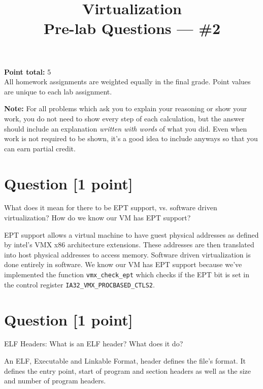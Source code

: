 \documentclass[11pt]{article}
\providecommand{\due}{}
\begin{document}
\title{Virtualization\\Pre-lab Questions --- \#2}
\date{\due}

\maketitle

\noindent \textbf{Point total:} 5
\\ All homework assignments are weighted equally in the final grade. Point values are unique to each lab assignment.

\textbf{Note:} For all problems which ask you to explain your reasoning or show your work, you do not need to show every step of each calculation, but the answer should include an explanation \emph{written with words} of what you did.  Even when work is not required to be shown, it’s a good idea to include anyways so that you can earn partial credit.

\section{Question [1 point]}

What does it mean for there to be EPT support, vs. software driven virtualization? How do we know our VM has EPT support?

\begin{solution}
EPT support allows a virtual machine to have guest physical addresses as defined by intel's VMX x86 architecture extensions. These addresses are then translated into host physical addresses to access memory. Software driven virtualization is done entirely in software. We know our VM has EPT support because we've implemented the function \texttt{vmx\_check\_ept} which checks if the EPT bit is set in the control register \texttt{IA32\_VMX\_PROCBASED\_CTLS2}. 
\end{solution}


\section{Question [1 point]}

ELF Headers:
What is an ELF header? What does it do?

\begin{solution}
An ELF, Executable and Linkable Format, header defines the file's format. It defines the entry point, start of program and section headers as well as the size and number of program headers.
\end{solution}
\end{document}
